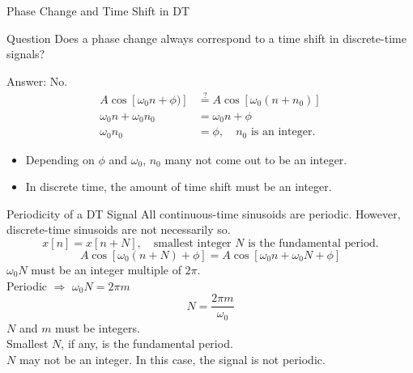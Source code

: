 \begin{frame}{Phase Change and Time Shift in DT}
    \begin{block}{Question}
        Does a phase change always correspond to a time shift in discrete-time signals?
    \end{block}
    \pause
    {
        Answer: No.\\
        \begin{align*}
          A\cos[\omega_0n+ \phi)] &\stackrel{?}{=}  A\cos[\omega_0(n+n_0)]\\
          \omega_0n + \omega_0n_0 &= \omega_0n + \phi \\
          \omega_0n_0 &= \phi,\quad n_0 \text{ is an integer}.
        \end{align*}

        \begin{itemize}
          \item Depending on $\phi$ and $\omega_0$, $n_0$ many not come out to be an \alert{integer}.
          \item In discrete time, the amount of time shift must be an integer.
        \end{itemize}
    }
\end{frame}

\begin{frame}{Periodicity of a DT Signal}
    All continuous-time sinusoids are  periodic. However, discrete-time sinusoids are not necessarily so.
    \begin{equation}
        x[n] = x[n+N], \quad \text{smallest integer $N$ is the fundamental period}.
    \end{equation}
    {
        \begin{equation*}
            A\cos[\omega_0(n+N) + \phi] = A\cos[\omega_0n+ \omega_0N + \phi]
        \end{equation*}
        $ \omega_0N$ must be an integer multiple of $2\pi$.\\
        Periodic $\Rightarrow$ $\omega_0N = 2\pi m$
        \begin{equation}\label{eq:dt_period}
            N = \frac{2\pi m}{\omega_0}
        \end{equation}
        $N$ and $m$ must be integers.\\
        Smallest $N$, if any, is the fundamental period.\\
        $N$ may not be an integer. In this case, the signal is not periodic.
    }
\end{frame}


